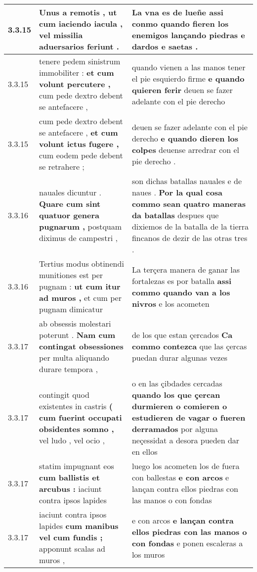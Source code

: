 \begin{tabular}{|p{1cm}|p{6.5cm}|p{6.5cm}|}
3.3.15 & Unus a remotis , \textbf{ ut cum iaciendo iacula , } vel missilia aduersarios feriunt . & La vna es de lueñe \textbf{ assi conmo quando fieren los enemigos } lançando piedras e dardos e saetas . \\\hline
3.3.15 & tenere pedem sinistrum immobiliter : \textbf{ et cum volunt percutere , } cum pede dextro debent se antefacere , & quando vienen a las manos tener el pie esquierdo firme \textbf{ e quando quieren ferir } deuen se fazer adelante con el pie derecho \\\hline
3.3.15 & cum pede dextro debent se antefacere , \textbf{ et cum volunt ictus fugere , } cum eodem pede debent se retrahere ; & deuen se fazer adelante con el pie derecho \textbf{ e quando dieren los colpes } deuense arredrar con el pie derecho . \\\hline
3.3.16 & nauales dicuntur . \textbf{ Quare cum sint quatuor genera pugnarum , } postquam diximus de campestri , & son dichas batallas nauales e de naues . \textbf{ Por la qual cosa commo sean quatro maneras da batallas } despues que dixiemos de la batalla de la tierra fincanos de dezir de las otras tres . \\\hline
3.3.16 & Tertius modus obtinendi munitiones est per pugnam : \textbf{ ut cum itur ad muros , } et cum per pugnam dimicatur & La terçera manera de ganar las fortalezas es por batalla \textbf{ assi commo quando van a los nivros } e los acometen \\\hline
3.3.17 & ab obsessis molestari poterunt . \textbf{ Nam cum contingat obsessiones } per multa aliquando durare tempora , & de los que estan çercados \textbf{ Ca commo contezca } que las çercas puedan durar algunas vezes \\\hline
3.3.17 & contingit quod existentes in castris \textbf{ ( cum fuerint occupati obsidentes somno , } vel ludo , vel ocio , & o en las çibdades cercadas \textbf{ quando los que çercan durmieren o comieren o estudieren de vagar o fueren derramados } por alguna neçessidat a desora pueden dar en ellos \\\hline
3.3.17 & statim impugnant eos \textbf{ cum ballistis et arcubus : } iaciunt contra ipsos lapides & luego los acometen los de fuera con ballestas \textbf{ e con arcos } e lançan contra ellos piedras con las manos o con fondas \\\hline
3.3.17 & iaciunt contra ipsos lapides \textbf{ cum manibus vel cum fundis ; } apponunt scalas ad muros , & e con arcos \textbf{ e lançan contra ellos piedras con las manos o con fondas } e ponen escaleras a los muros \\\hline

\end{tabular}
